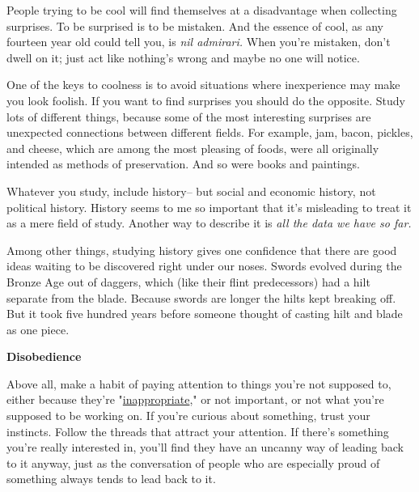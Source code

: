 People trying to be cool will
                  find themselves at a disadvantage when collecting surprises.
                  To be surprised is to be mistaken. And the essence of cool, as
                  any fourteen year old could tell you, is
                  \emph{nil admirari.} When you're mistaken, don't dwell on it;
                  just act like nothing's wrong and maybe no one will notice.

One
                  of the keys to coolness is to avoid situations where
                  inexperience may make you look foolish. If you want to find
                  surprises you should do the opposite. Study lots of different
                  things, because some of the most interesting surprises are
                  unexpected connections between different fields. For example,
                  jam, bacon, pickles, and cheese, which are among the most
                  pleasing of foods, were all originally intended as methods of
                  preservation. And so were books and paintings.

Whatever
                  you study, include history-- but social and economic history,
                  not political history. History seems to me so important that
                  it's misleading to treat it as a mere field of study. Another
                  way to describe it is \emph{all the data we have so far.}

Among other things, studying history gives one
                  confidence that there are good ideas waiting to be discovered
                  right under our noses. Swords evolved during the Bronze Age
                  out of daggers, which (like their flint predecessors) had a
                  hilt separate from the blade. Because swords are longer the
                  hilts kept breaking off. But it took five hundred years before
                  someone thought of casting hilt and blade as one piece.

\textbf{Disobedience}

Above all, make a habit of paying attention to
                  things you're not supposed to, either because they're "\href{http://www.paulgraham.com/say.html}{inappropriate}," or not important, or not what you're supposed to be
                  working on. If you're curious about something, trust your
                  instincts. Follow the threads that attract your attention. If
                  there's something you're really interested in, you'll find
                  they have an uncanny way of leading back to it anyway, just as
                  the conversation of people who are especially proud of
                  something always tends to lead back to it.

